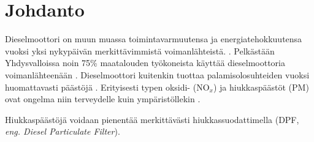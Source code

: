 \chapter{Johdanto}%
\label{ch:johdanto}
Dieselmoottori on muun muassa toimintavarmuutensa ja energiatehokkuutensa vuoksi yksi nykypäivän merkittävimmistä voimanlähteistä.  
\cite[s. 121, 137-138]{Koten_2024}.
Pelkästään Yhdysvalloissa noin 75\% maatalouden työkoneista käyttää dieselmoottoria voimanlähteenään 
\cite[s. 122]{Koten_2024}.  
Dieselmoottori kuitenkin tuottaa palamisolosuhteiden vuoksi
huomattavasti päästöjä \cite{FiebigMichael2014Pefd}. Erityisesti typen oksidi- (NO\(_x\)) ja hiukkaspäästöt (PM) ovat ongelma niin terveydelle kuin ympäristöllekin \cite{FiebigMichael2014Pefd}\cite[s. 138]{Koten_2024}.

Hiukkaspäästöjä voidaan pienentää merkittävästi hiukkassuodattimella (DPF, \emph{eng. Diesel Particulate Filter}). 

